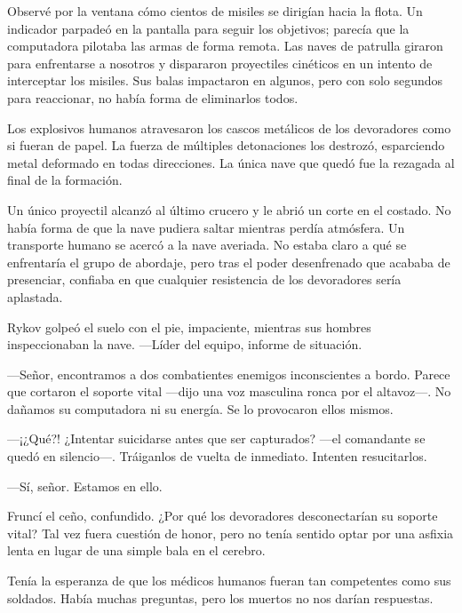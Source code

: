 Observé por la ventana cómo cientos de misiles se dirigían hacia la flota. Un indicador parpadeó en la pantalla para seguir los objetivos; parecía que la computadora pilotaba las armas de forma remota. Las naves de patrulla giraron para enfrentarse a nosotros y dispararon proyectiles cinéticos en un intento de interceptar los misiles. Sus balas impactaron en algunos, pero con solo segundos para reaccionar, no había forma de eliminarlos todos.

Los explosivos humanos atravesaron los cascos metálicos de los devoradores como si fueran de papel. La fuerza de múltiples detonaciones los destrozó, esparciendo metal deformado en todas direcciones. La única nave que quedó fue la rezagada al final de la formación.

Un único proyectil alcanzó al último crucero y le abrió un corte en el costado. No había forma de que la nave pudiera saltar mientras perdía atmósfera. Un transporte humano se acercó a la nave averiada. No estaba claro a qué se enfrentaría el grupo de abordaje, pero tras el poder desenfrenado que acababa de presenciar, confiaba en que cualquier resistencia de los devoradores sería aplastada.

Rykov golpeó el suelo con el pie, impaciente, mientras sus hombres inspeccionaban la nave. —Líder del equipo, informe de situación.

—Señor, encontramos a dos combatientes enemigos inconscientes a bordo. Parece que cortaron el soporte vital —dijo una voz masculina ronca por el altavoz—. No dañamos su computadora ni su energía. Se lo provocaron ellos mismos.

—¡¿Qué?! ¿Intentar suicidarse antes que ser capturados? —el comandante se quedó en silencio—. Tráiganlos de vuelta de inmediato. Intenten resucitarlos.

—Sí, señor. Estamos en ello.

Fruncí el ceño, confundido. ¿Por qué los devoradores desconectarían su soporte vital? Tal vez fuera cuestión de honor, pero no tenía sentido optar por una asfixia lenta en lugar de una simple bala en el cerebro.

Tenía la esperanza de que los médicos humanos fueran tan competentes como sus soldados. Había muchas preguntas, pero los muertos no nos darían respuestas.
